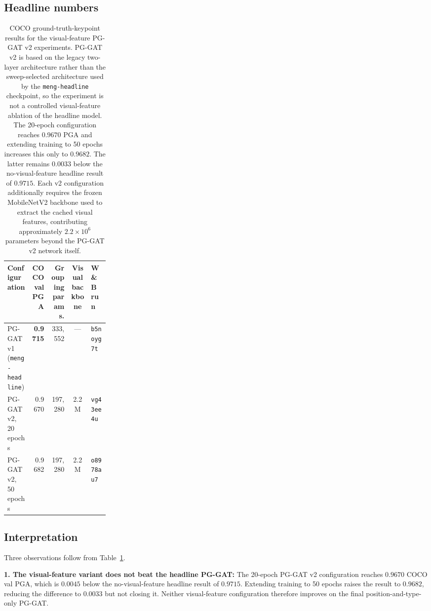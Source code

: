 \subsection{Headline numbers}
\label{sec_res_v2_numbers}

\begin{table}[H]
\centering
\caption[COCO ground-truth-keypoint results for the visual-feature PG-GAT v2 experiments.]{COCO ground-truth-keypoint results for the visual-feature
PG-GAT v2 experiments. PG-GAT v2 is based on the legacy two-layer
architecture rather than the sweep-selected architecture used by the
\texttt{meng-headline} checkpoint, so the experiment is not a
controlled visual-feature ablation of the headline model. The
20-epoch configuration reaches $0.9670$ PGA and extending training to
50 epochs increases this only to $0.9682$. The latter remains $0.0033$
below the no-visual-feature headline result of $0.9715$. Each v2
configuration additionally requires the frozen MobileNetV2 backbone
used to extract the cached visual features, contributing approximately
$2.2\times10^{6}$ parameters beyond the PG-GAT v2 network itself.}
\label{tab:v2_headline}
\tablesize
\setlength{\tabcolsep}{5pt}
\begin{tabular}{>{\raggedright\arraybackslash}p{0.24\linewidth}rrcl}
\toprule
Configuration
    & COCO val PGA
    & Grouping params.
    & Visual backbone
    & W\&B run \\
\midrule
PG-GAT v1 (\texttt{meng-headline})
    & \textbf{0.9715}
    & 333{,}552
    & ---
    & \texttt{b5noyg7t} \\
PG-GAT v2, 20 epochs
    & 0.9670
    & 197{,}280
    & 2.2M
    & \texttt{vg43ee4u} \\
PG-GAT v2, 50 epochs
    & 0.9682
    & 197{,}280
    & 2.2M
    & \texttt{o8978au7} \\
\bottomrule
\end{tabular}
\end{table}

\subsection{Interpretation}
\label{sec_res_v2_discussion}

Three observations follow from Table~\ref{tab:v2_headline}.

\textbf{1. The visual-feature variant does not beat the headline
PG-GAT:}
The 20-epoch PG-GAT v2 configuration reaches $0.9670$ COCO val PGA,
which is $0.0045$ below the no-visual-feature headline result of
$0.9715$.
Extending training to 50 epochs raises the result to $0.9682$,
reducing the difference to $0.0033$ but not closing it.
Neither visual-feature configuration therefore improves on the final
position-and-type-only PG-GAT.

